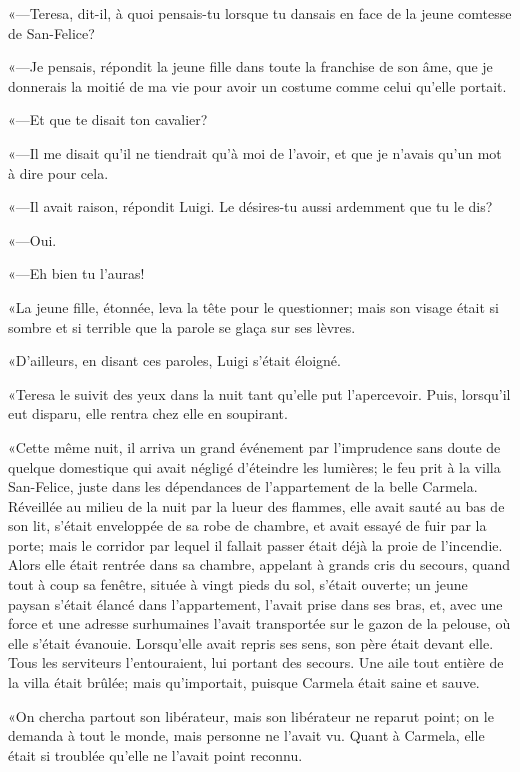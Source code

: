 «—Teresa, dit-il, à quoi pensais-tu lorsque tu dansais en face de la jeune comtesse de San-Felice? 

«—Je pensais, répondit la jeune fille dans toute la franchise de son âme, que je donnerais la moitié de ma vie pour avoir un costume comme celui qu'elle portait. 

«—Et que te disait ton cavalier? 

«—Il me disait qu'il ne tiendrait qu'à moi de l'avoir, et que je n'avais qu'un mot à dire pour cela. 

«—Il avait raison, répondit Luigi. Le désires-tu aussi ardemment que tu le dis? 

«—Oui. 

«—Eh bien tu l'auras! 

«La jeune fille, étonnée, leva la tête pour le questionner; mais son visage était si sombre et si terrible que la parole se glaça sur ses lèvres. 

«D'ailleurs, en disant ces paroles, Luigi s'était éloigné. 

«Teresa le suivit des yeux dans la nuit tant qu'elle put l'apercevoir. Puis, lorsqu'il eut disparu, elle rentra chez elle en soupirant. 

«Cette même nuit, il arriva un grand événement par l'imprudence sans doute de quelque domestique qui avait négligé d'éteindre les lumières; le feu prit à la villa San-Felice, juste dans les dépendances de l'appartement de la belle Carmela. Réveillée au milieu de la nuit par la lueur des flammes, elle avait sauté au bas de son lit, s'était enveloppée de sa robe de chambre, et avait essayé de fuir par la porte; mais le corridor par lequel il fallait passer était déjà la proie de l'incendie. Alors elle était rentrée dans sa chambre, appelant à grands cris du secours, quand tout à coup sa fenêtre, située à vingt pieds du sol, s'était ouverte; un jeune paysan s'était élancé dans l'appartement, l'avait prise dans ses bras, et, avec une force et une adresse surhumaines l'avait transportée sur le gazon de la pelouse, où elle s'était évanouie. Lorsqu'elle avait repris ses sens, son père était devant elle. Tous les serviteurs l'entouraient, lui portant des secours. Une aile tout entière de la villa était brûlée; mais qu'importait, puisque Carmela était saine et sauve. 

«On chercha partout son libérateur, mais son libérateur ne reparut point; on le demanda à tout le monde, mais personne ne l'avait vu. Quant à Carmela, elle était si troublée qu'elle ne l'avait point reconnu. 

